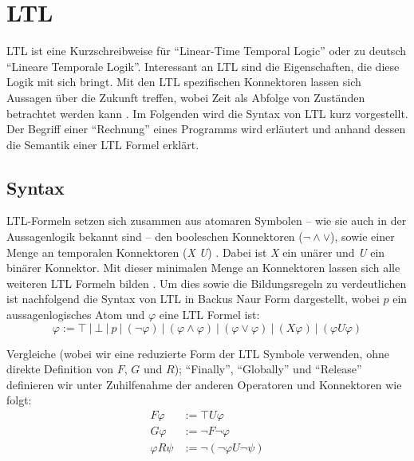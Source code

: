 \section{LTL}

LTL ist eine Kurzschreibweise für "`Linear-Time Temporal Logic"' oder zu deutsch "`Lineare Temporale Logik"'. Interessant an LTL sind die Eigenschaften, die diese Logik mit sich bringt. Mit den LTL spezifischen Konnektoren lassen sich Aussagen über die Zukunft treffen, wobei Zeit als Abfolge von Zuständen betrachtet werden kann \cite{huth+04}. Im Folgenden wird die Syntax von LTL kurz vorgestellt. Der Begriff einer "`Rechnung"' eines Programms wird erläutert und anhand dessen die Semantik einer LTL Formel erklärt.

\subsection{Syntax}

LTL-Formeln setzen sich zusammen aus atomaren Symbolen -- wie sie auch in der Aussagenlogik bekannt sind -- den booleschen Konnektoren ($\lnot \land \lor$), sowie einer Menge an temporalen Konnektoren (\textit{X U}) \cite{huth+04,vardi+96}. Dabei ist \textit{X} ein unärer und \textit{U} ein binärer Konnektor. Mit dieser minimalen Menge an Konnektoren lassen sich alle weiteren LTL Formeln bilden \cite{vardi+96}.
Um dies sowie die Bildungsregeln zu verdeutlichen ist nachfolgend die Syntax von LTL in Backus Naur Form dargestellt, wobei $p$ ein aussagenlogisches Atom und $\varphi$ eine LTL Formel ist:
\begin{equation}
\label{ltl:syntax_basics}
    \varphi := \top\ |\ \bot\ |\ p\ |\ (\lnot\varphi)\ |\ (\varphi \land \varphi)\ |\ (\varphi \lor \varphi)\ |\ (X\varphi)\ |\ (\varphi U\varphi)
\end{equation}

Vergleiche \cite{huth+04} (wobei wir eine reduzierte Form der LTL Symbole verwenden, ohne direkte Definition von $F$, $G$ und $R$); "`Finally"', "`Globally"' und "`Release"' definieren wir unter Zuhilfenahme der anderen Operatoren und Konnektoren wie folgt:
\begin{equation}
\label{ltl:syntax_details}
\begin{split}
    F\varphi &:= \top U\varphi\\
    G\varphi &:= \lnot F\lnot\varphi\\
    \varphi R\psi &:= \lnot(\lnot\varphi U\lnot\psi)\\
\end{split}
\end{equation}

